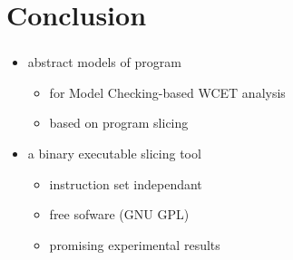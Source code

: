 \documentclass{beamer}
\begin{document}

  \section*{Conclusion}
  \begin{frame}
    \frametitle{\secname}

    \begin{itemize}
    \item abstract models of program
      \begin{itemize}
        \item for Model Checking-based WCET analysis
        \item based on program slicing
      \end{itemize}
      
    \vspace{1em}
    \item a binary executable slicing tool
      \begin{itemize}
        \item instruction set independant
        \item free sofware (GNU GPL)
        \item promising experimental results
      \end{itemize}


    \end{itemize}
  \end{frame}
  
\end{document}
